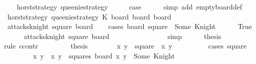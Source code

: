 \begin{isabellebody}
\ \ \isamarkupfalse%
\ {\isacharparenleft}{}\ horst{\isacharunderscore}strategy\ queenie{\isacharunderscore}strategy{\isacharparenright}\isanewline
\ \ \isamarkupfalse%
\ \isamarkupfalse%
\ {\isacharquery}case\isanewline
\ \ \ \ \isamarkupfalse%
\ {\isacharparenleft}simp\ add{\isacharcolon}\ empty{\isacharunderscore}board{\isacharunderscore}def{\isacharparenright}\isanewline
{}\isamarkupfalse%
\isanewline
\ \ \isamarkupfalse%
\ {\isacharparenleft}{}\ horst{\isacharunderscore}strategy\ queenie{\isacharunderscore}strategy\ K\ board\ board{\isacharprime}\ board{\isacharprime}{\isacharprime}{\isacharparenright}\isanewline
\ \ \isamarkupfalse%
\ {\isachardoublequoteopen}{\isasymnot}\ attacks{\isacharunderscore}knight\ square\ board{\isacharprime}{\isachardoublequoteclose}\isanewline
\ \ \isamarkupfalse%
\ {\isacharparenleft}cases\ {\isachardoublequoteopen}board\ square\ {\isacharequal}\ Some\ Knight{\isachardoublequoteclose}{\isacharparenright}\isanewline
\ \ \ \ \isamarkupfalse%
\ True\isanewline
\ \ \ \ \isamarkupfalse%
\ {\isachardoublequoteopen}{\isasymnot}\ attacks{\isacharunderscore}knight\ square\ board{\isachardoublequoteclose}\isanewline
\ \ \ \ \ \ \isamarkupfalse%
\ {}\isanewline
\ \ \ \ \ \ \isamarkupfalse%
\ simp\isanewline
\ \ \ \ \isamarkupfalse%
\ {\isacharquery}thesis\isanewline
\ \ \ \ \isamarkupfalse%
\ {\isacharparenleft}rule\ ccontr{\isacharparenright}\isanewline
\ \ \ \ \ \ \isamarkupfalse%
\ {\isachardoublequoteopen}{\isasymnot}\ {\isacharquery}thesis{\isachardoublequoteclose}\isanewline
\ \ \ \ \ \ \isamarkupfalse%
\ x\ y\ \ {\isachardoublequoteopen}square\ {\isacharequal}\ {\isacharparenleft}x{\isacharcomma}\ y{\isacharparenright}{\isachardoublequoteclose}\isanewline
\ \ \ \ \ \ \ \ \isamarkupfalse%
\ {\isacharparenleft}cases\ square{\isacharparenright}\isanewline
\ \ \ \ \ \ \isamarkupfalse%
\ \isamarkupfalse%
\ x{\isacharprime}\ y{\isacharprime}\ \ {\isachardoublequoteopen}{\isacharparenleft}x{\isacharprime}{\isacharcomma}\ y{\isacharprime}{\isacharparenright}\ {\isasymin}\ squares{\isachardoublequoteclose}\ {\isachardoublequoteopen}board{\isacharprime}\ {\isacharparenleft}x{\isacharprime}{\isacharcomma}\ y{\isacharprime}{\isacharparenright}\ {\isacharequal}\ Some\ Knight{\isachardoublequoteclose}\isanewline

\end{isabellebody}
